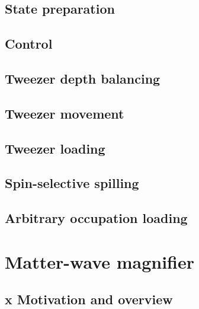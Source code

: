 \documentclass[twoside]{article}
\begin{document}
\subsection{State preparation} \label{subsec:state-prepation}

\subsection{Control} \label{subsec:control}


\subsection{Tweezer depth balancing} \label{subsec:balancing}


\subsection{Tweezer movement} \label{subsec:tweezer-movement}


\subsection{Tweezer loading} \label{subsec:tweezer-loading}


\subsection{Spin-selective spilling} \label{subsec:spin-selective-spilling}


\subsection{Arbitrary occupation loading} \label{subsec:arbitrary-occupation-loading}



\newpage
\section{Matter-wave magnifier} \label{sec:mwm}

\subsection{x Motivation and overview}
\end{document}
